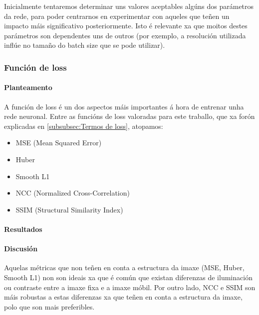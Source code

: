 Inicialmente tentaremos determinar uns valores aceptables algúns dos parámetros da rede, para poder centrarnos en experimentar con aqueles que teñen un impacto máis significativo posteriormente.
Isto é relevante xa que moitos destes parámetros son dependentes uns de outros (por exemplo, a resolución utilizada inflúe no tamaño do batch size que se pode utilizar).

\subsubsection{Función de loss}
\label{subsubsec:Función de loss}

\paragraph{Planteamento}
\label{par:Planteamento}

A función de loss é un dos aspectos máis importantes á hora de entrenar unha rede neuronal.
Entre as funcións de loss valoradas para este traballo, que xa forón explicadas en \ref{subsubsec:Termos de loss}, atopamos:

\begin{itemize}
    \item MSE (Mean Squared Error)
    \item Huber
    \item Smooth L1
    \item NCC (Normalized Cross-Correlation)
    \item SSIM (Structural Similarity Index)
\end{itemize}


\paragraph{Resultados}
\label{par:Resultados}



\paragraph{Discusión}
\label{par:Discusión}

Aquelas métricas que non teñen en conta a estructura da imaxe (MSE, Huber, Smooth L1) non son ideais xa que é común que existan diferenzas de iluminación ou contraste entre a imaxe fixa e a imaxe móbil.
Por outro lado, NCC e SSIM son máis robustas a estas diferenzas xa que teñen en conta a estructura da imaxe, polo que son mais preferibles.


